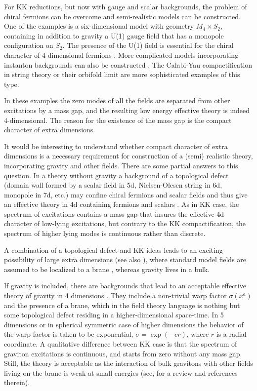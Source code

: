 \documentclass[a4paper,12pt]{article}
\begin{document}
For KK reductions, but now with gauge and scalar backgrounds, the
problem of chiral fermions can be overcome and semi-realistic models
can be constructed. One of the examples is a six-dimensional model
with geometry $M_4\times S_2$, containing in addition to gravity a
U(1) gauge field that has a monopole configuration on $S_2$. The
presence of the U(1) field is essential for the chiral character of
4-dimensional fermions
\cite{Randjbar-Daemi:1982hi,Randjbar-Daemi:1983bw}. More complicated
models incorporating instanton backgrounds can also be constructed
\cite{Randjbar-Daemi:1983qa,Randjbar-Daemi:1983qb}. The Calabi-Yau
compactification in string theory or their orbifold limit
\cite{GSW:1987} are more sophisticated examples of this type.

In these examples the zero modes of all the fields are separated
from other excitations by a mass gap, and the resulting low energy
effective theory is indeed 4-dimensional.  The reason for the
existence of the mass gap is the compact character of extra
dimensions.

It would be interesting to understand whether compact character of
extra dimensions is a necessary requirement for construction of a
(semi) realistic theory, incorporating gravity and other fields.
There are some partial answers to this question. In a theory without
gravity a background of a topological defect (domain wall formed by a
scalar field in 5d, Nielsen-Olesen string in 6d, monopole in 7d,
etc.) may confine chiral fermions and scalar fields and thus give an
effective theory in 4d containing fermions and scalars
\cite{Rubakov:bb,Akama:jy}. As in KK case, the spectrum of
excitations contains a mass gap that insures the effective 4d
character of low-lying excitations, but  contrary to the KK
compactification, the spectrum of higher lying modes is continuous
rather than discrete.

A combination of a topological defect and KK ideas leads to an
exciting possibility of large extra dimensions 
\cite{Arkani-Hamed:1998rs} (see also \cite{Antoniadis:1990ew}), where
standard model fields are assumed to be  localized to a brane
\cite{Polchinski:1995mt}, whereas gravity lives in a bulk.

If gravity is included, there are backgrounds that lead to an
acceptable effective theory of gravity in 4 dimensions
\cite{Randall:1999vf}. They include a non-trivial warp factor
\cite{Rubakov:1983bz} $\sigma(x^a)$ and the presence of a brane,
which in the field theory language is nothing but some topological
defect residing in a higher-dimensional space-time. In 5 dimensions
\cite{Randall:1999vf} or in spherical symmetric case of higher
dimensions
\cite{Gherghetta:2000qi,Gherghetta:2000jf,Giovannini:2001hh} the
behavior of the warp factor is taken to be exponential, $\sigma
=\exp(-c r)$, where $r$ is a radial coordinate. A qualitative
difference between KK case is that the spectrum of graviton
excitations is continuous, and starts from zero without any mass gap.
Still, the theory is acceptable as the interaction of bulk gravitons
with other fields living on the brane is weak at small energies (see,
for a review \cite{Rubakov:2001kp} and references therein).
\end{document}
